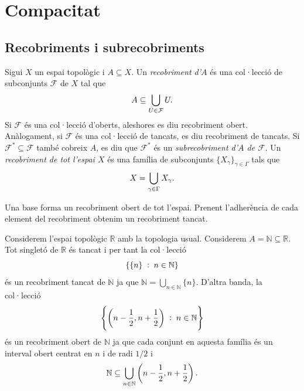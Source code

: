 \documentclass[../main.tex]{subfiles}
\begin{document}
\chapter{Compacitat}
\section{Recobriments i subrecobriments}

\begin{defi}
[Recobriments]\label{def:recobriment}\label{def:subrecobriment} Sigui $X$ un espai topològic i $A\subseteq X$. Un \textit{recobriment d'$A$} és una col·lecció de subconjunts $\mathcal{F}$ de $X$ tal que
\begin{equation}
    \notag
    A\subseteq \bigcup_{U\in\mathcal{F}}U.
\end{equation}
Si $\mathcal{F}$ és una col·lecció d'oberts, aleshores es diu recobriment obert. Anàlogament, si $\mathcal{F}$ és una col·lecció de tancats, es diu recobriment de tancats. Si $\mathcal{F}^*\subseteq\mathcal{F}$ també cobreix $A$, es diu que $\mathcal{F}^*$ és un \textit{subrecobriment d'$A$ de $\mathcal{F}$}. Un \textit{recobriment de tot l'espai $X$} és una família de subconjunts $\{X_\gamma\}_{\gamma\in\Gamma}$ tals que
\begin{equation}
    \notag
    X = \bigcup_{\gamma\in \Gamma}X_\gamma.
\end{equation}
\end{defi}

\begin{ej}
\label{ej:recobriment1} Una base forma un recobriment obert de tot l'espai. Prenent l'adherència de cada element del recobriment obtenim un recobriment tancat.
\end{ej}

\begin{ej}
\label{ej:recobriment2} Considerem l'espai topològic $\mathbb{R}$ amb la topologia usual. Considerem $A = \mathbb{N}\subseteq\mathbb{R}$. Tot singletó de $\mathbb{R}$ és tancat i per tant la col·lecció
\begin{equation}
    \notag
    \{\{n\}\;:\;n\in\mathbb{N}\}
\end{equation}
és un recobriment tancat de $\mathbb{N}$ ja que $\mathbb{N}= \bigcup_{n\in\mathbb{N}}\{n\}$. D'altra banda, la col·lecció 
\begin{equation}
    \notag
    \left\{\left(n-\frac{1}{2},n+\frac{1}{2}\right)\;:\;n\in\mathbb{N}\right\}
\end{equation}
és un recobriment obert de $\mathbb{N}$ ja que cada conjunt en aquesta família és un interval obert centrat en $n$ i de radi $1/2$ i
\begin{equation}
    \notag
    \mathbb{N}\subseteq \bigcup_{n\in\mathbb{N}}\left(n-\frac{1}{2},n+\frac{1}{2}\right).
\end{equation}
\end{ej}
\end{document}
